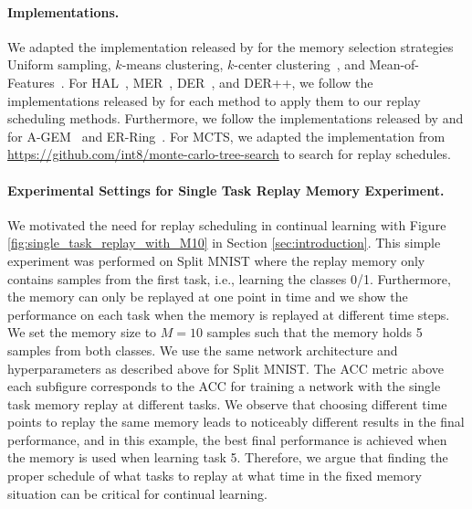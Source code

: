 \paragraph{Implementations.} We adapted the implementation released by \citet{borsos2020coresets} for the memory selection strategies Uniform sampling, $k$-means clustering, $k$-center clustering~\citep{nguyen2017variational}, and Mean-of-Features~\citep{rebuffi2017icarl}. For HAL~\cite{chaudhry2021using}, MER~\cite{riemer2018learning}, DER~\cite{buzzega2020dark}, and DER++, we follow the implementations released by \cite{buzzega2020dark} for each method to apply them to our replay scheduling methods. Furthermore, we follow the implementations released by \citet{chaudhry2019tiny} and \citet{mirzadeh2021cl-gym} for A-GEM~\citep{chaudhry2018efficient} and ER-Ring~\citep{chaudhry2019tiny}. For MCTS, we adapted the implementation from {\footnotesize \url{https://github.com/int8/monte-carlo-tree-search}} to search for replay schedules.

\vspace{-2mm}
\paragraph{Experimental Settings for Single Task Replay Memory Experiment.} We motivated the need for replay scheduling in continual learning with Figure \ref{fig:single_task_replay_with_M10} in Section \ref{sec:introduction}. This simple experiment was performed on Split MNIST where the replay memory only contains samples from the first task, i.e., learning the classes 0/1. Furthermore, the memory can only be replayed at one point in time and we show the performance on each task when the memory is replayed at different time steps. We set the memory size to $M=10$ samples such that the memory holds 5 samples from both classes. We use the same network architecture and hyperparameters as described above for Split MNIST. The ACC metric above each subfigure corresponds to the ACC for training a network with the single task memory replay at different tasks. We observe that choosing different time points to replay the same memory leads to noticeably different results in the final performance, and in this example, the best final performance is achieved when the memory is used when learning task 5. Therefore, we argue that finding the proper schedule of what tasks to replay at what time in the fixed memory situation can be critical for continual learning. 


